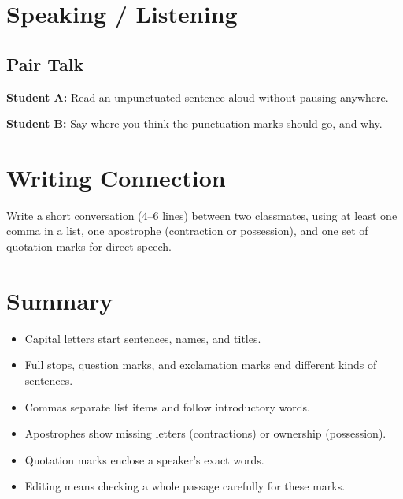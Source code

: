 \section{Speaking / Listening}
\subsection*{Pair Talk}
\textbf{Student A:} Read an unpunctuated sentence aloud without pausing anywhere.

\textbf{Student B:} Say where you think the punctuation marks should go, and why.

\section{Writing Connection}
Write a short conversation (4--6 lines) between two classmates, using at least one comma in a list, one apostrophe (contraction or possession), and one set of quotation marks for direct speech.

\section{Summary}
\begin{summarybox}
\begin{itemize}
    \item Capital letters start sentences, names, and titles.
    \item Full stops, question marks, and exclamation marks end different kinds of sentences.
    \item Commas separate list items and follow introductory words.
    \item Apostrophes show missing letters (contractions) or ownership (possession).
    \item Quotation marks enclose a speaker's exact words.
    \item Editing means checking a whole passage carefully for these marks.
\end{itemize}
\end{summarybox}

